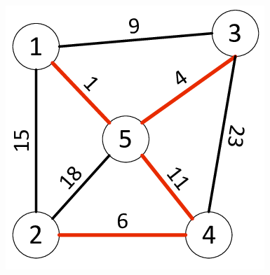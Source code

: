 \documentclass[handout]{beamer}
\begin{document}
\begin{frame}
\begin{figure}
	\centering
	\includegraphics[width=.6\linewidth]{imgs/mst}
\end{figure}

\end{frame}
\end{document}
